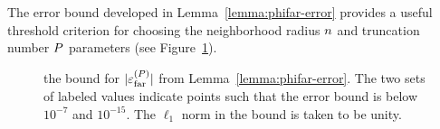 The error bound developed in Lemma~\ref{lemma:phifar-error} provides a
useful threshold criterion for choosing the neighborhood radius
$n$ and truncation number $P$ parameters
(see Figure~\ref{fig:phifar-error}).

\begin{figure}[h]
  \centering
  
  \caption{the bound for $|{\varepsilon}^{(P)}_{\operatorname{far}}|$ from
    Lemma~\ref{lemma:phifar-error}. The two sets of labeled values
    indicate points such that the error bound is below $10^{-7}$ and
    $10^{-15}$. The $\ell_1$ norm in the bound is taken to be
    unity.}\label{fig:phifar-error}
\end{figure}


